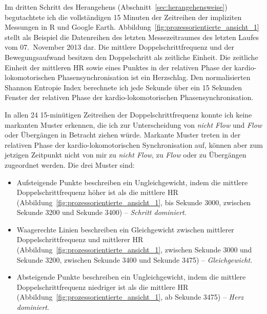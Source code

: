 \label{ssub:prozessorientierter_ansatz_5_1} 
\begin{sidewaysfigure}
	\resizebox{1.00 
	\textwidth}{!}{
	
	 }
	
	\caption[Beispielhafte Prozessdarstellung des letzten Laufabschnitts vom 07. November 2013 (Erste Studie: Laufen)]{Beispielhafte Prozessdarstellung des letzten Laufabschnitts vom 07. November 2013 \\
	\hspace{ 
	\textwidth} \emph{Anmerkung}: Mittlere DF = Mittlere Doppelschrittfrequenz \\
	\hspace{ 
	\textwidth} Rel. Phase = Relative Phase} \label{fig:prozessorientierte_ansicht_1} 
\end{sidewaysfigure}

Im dritten Schritt des Herangehens (Abschnitt~\ref{sec:herangehensweise}) begutachtete ich die vollständigen 15 Minuten der Zeitreihen der impliziten Messungen in R und Google Earth. Abbildung~\ref{fig:prozessorientierte_ansicht_1} stellt als Beispiel die Datenreihen des letzten Messezeitraumes des letzten Laufes vom 07.~November 2013 dar. Die mittlere Doppelschrittfrequenz und der Bewegungsaufwand besitzen den Doppelschritt als zeitliche Einheit. Die zeitliche Einheit der mittleren \ac{HR} sowie eines Punktes in der relativen Phase der kardio-lokomotorischen Phasensynchronisation ist ein Herzschlag. Den normalisierten Shannon Entropie Index berechnete ich jede Sekunde über ein 15 Sekunden Fenster der relativen Phase der kardio-lokomotorischen Phasensynchronisation. 

In allen 24 15-minütigen Zeitreihen der Doppelschrittfrequenz konnte ich keine markanten Muster erkennen, die ich zur Unterscheidung von \emph{nicht Flow} und \emph{Flow} oder Übergängen in Betracht ziehen würde. Markante Muster treten in der relativen Phase der kardio-lokomotorischen Synchronisation auf, können aber zum jetzigen Zeitpunkt nicht von mir zu \emph{nicht Flow}, zu \emph{Flow} oder zu Übergängen zugeordnet werden. Die drei Muster sind: 
\begin{itemize}
	
	\item Aufsteigende Punkte beschreiben ein Ungleichgewicht, indem die mittlere Doppelschrittfrequenz höher ist als die mittlere \ac{HR} (Abbildung~\ref{fig:prozessorientierte_ansicht_1}, bis Sekunde 3000, zwischen Sekunde 3200 und Sekunde 3400) -- \emph{Schritt dominiert}.
	
	\item Waagerechte Linien beschreiben ein Gleichgewicht zwischen mittlerer Doppelschrittfrequenz und mittlerer \ac{HR} (Abbildung~\ref{fig:prozessorientierte_ansicht_1}, zwischen Sekunde 3000 und Sekunde 3200, zwischen Sekunde 3400 und Sekunde 3475) -- \emph{Gleichgewicht}.
	
	\item Absteigende Punkte beschreiben ein Ungleichgewicht, indem die mittlere Doppelschrittfrequenz niedriger ist als die mittlere \ac{HR} (Abbildung~\ref{fig:prozessorientierte_ansicht_1}, ab Sekunde 3475) -- \emph{Herz dominiert}. 
\end{itemize}

